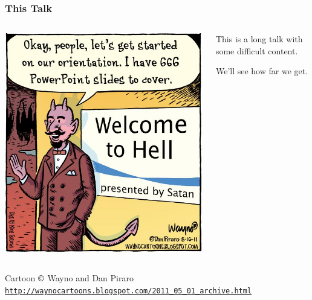 \documentclass[10pt, xcolor=x11names, compress]{beamer}
\begin{document}
\begin{frame}
  \frametitle{This Talk}
  \begin{columns}
    \begin{column}{0.5\linewidth}
      \includegraphics[width=\linewidth]{images/bz-panel-05-16-11-wno.jpg}
    \end{column}
    \begin{column}{0.5\linewidth}
      This is a long talk with some difficult content.  

      \bigskip

      We'll see how far we get.
    \end{column}
  \end{columns}
  \begin{bottomnote}[0.4][19.0]%
    Cartoon $\copyright$ Wayno and Dan Piraro
    \href{http://waynocartoons.blogspot.com/2011_05_01_archive.html}
    {\color{LightBlue4}{\ComputerMouse~}\texttt{http://waynocartoons.blogspot.com/2011\_05\_01\_archive.html}}
  \end{bottomnote}
\end{frame}
\end{document}
